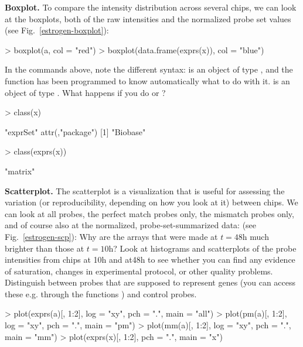 \documentclass[a4paper]{article}
\begin{document}
\begin{exercises}
\item {\bf Boxplot.}  
To compare the intensity distribution across several chips, 
we can look at the boxplots, both of the raw intensities 
 and the normalized probe set values 
(see Fig.~\ref{estrogen-boxplot}):
%
\begin{Schunk}
\begin{Sinput}
> boxplot(a, col = "red")
> boxplot(data.frame(exprs(x)), col = "blue")
\end{Sinput}
\end{Schunk}
%
In the commands above, note the different syntax:  is an 
object of type , and the  function 
has been programmed to know automatically what to do with it. 
 is an object of type . 
What happens if you do  or 
?

\begin{Schunk}
\begin{Sinput}
> class(x)
\end{Sinput}
\begin{Soutput}
[1] "exprSet"
attr(,"package")
[1] "Biobase"
\end{Soutput}
\begin{Sinput}
> class(exprs(x))
\end{Sinput}
\begin{Soutput}
[1] "matrix"
\end{Soutput}
\end{Schunk}

\item {\bf Scatterplot.}  
The scatterplot is a visualization that is useful for assessing the
variation (or reproducibility, depending on how you look at it)
between chips. We can look at all probes, the perfect match probes 
only, the mismatch probes only, and of course also at the 
normalized, probe-set-summarized data:
(see Fig.~\ref{estrogen-scp}):
%
%
Why are the arrays that were made at $t=48$h much brighter than those at
$t=10$h?  Look at histograms and scatterplots of the probe intensities from
chips at 10h and at48h to see whether you can find any evidence of saturation,
changes in experimental protocol, or other quality problems. Distinguish
between probes that are supposed to represent genes (you can access these
e.g. through the functions ) and control probes.

\begin{Schunk}
\begin{Sinput}
> plot(exprs(a)[, 1:2], log = "xy", pch = ".", main = "all")
> plot(pm(a)[, 1:2], log = "xy", pch = ".", main = "pm")
> plot(mm(a)[, 1:2], log = "xy", pch = ".", main = "mm")
> plot(exprs(x)[, 1:2], pch = ".", main = "x")
\end{Sinput}
\end{Schunk}


\end{exercises}
\end{document}
